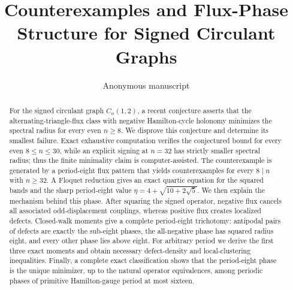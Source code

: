 \documentclass[11pt]{article}
\title{Counterexamples and Flux-Phase Structure for Signed Circulant Graphs}
\author{Anonymous manuscript}
\date{}
\begin{document}
\maketitle
\begin{abstract}
For the signed circulant graph \(C_n(1,2)\), a recent conjecture asserts that the
alternating-triangle-flux class with negative Hamilton-cycle holonomy minimizes
the spectral radius for every even \(n\ge 8\). We disprove this conjecture and
determine its smallest failure. Exact exhaustive computation verifies the
conjectured bound for every even \(8\le n\le 30\), while an explicit signing at
\(n=32\) has strictly smaller spectral radius; thus the finite minimality claim
is computer-assisted. The counterexample is generated by a period-eight flux
pattern that yields counterexamples for every \(8\mid n\) with \(n\ge 32\). A Floquet
reduction gives an exact quartic equation for the squared bands and the sharp
period-eight value
\(\eta=4+\sqrt{10+2\sqrt{5}}\). We then explain the mechanism behind this phase.
After squaring the signed operator, negative flux cancels all associated
odd-displacement couplings, whereas positive flux creates localized defects.
Closed-walk moments give a complete period-eight trichotomy: antipodal pairs of
defects are exactly the sub-eight phases, the all-negative phase has squared
radius eight, and every other phase lies above eight. For arbitrary period we
derive the first three exact moments and obtain necessary defect-density and
local-clustering inequalities. Finally, a complete exact classification shows
that the period-eight phase is the unique minimizer, up to the natural
operator equivalences, among periodic phases of primitive Hamilton-gauge period
at most sixteen.
\end{abstract}
\tableofcontents












\appendix



\end{document}
